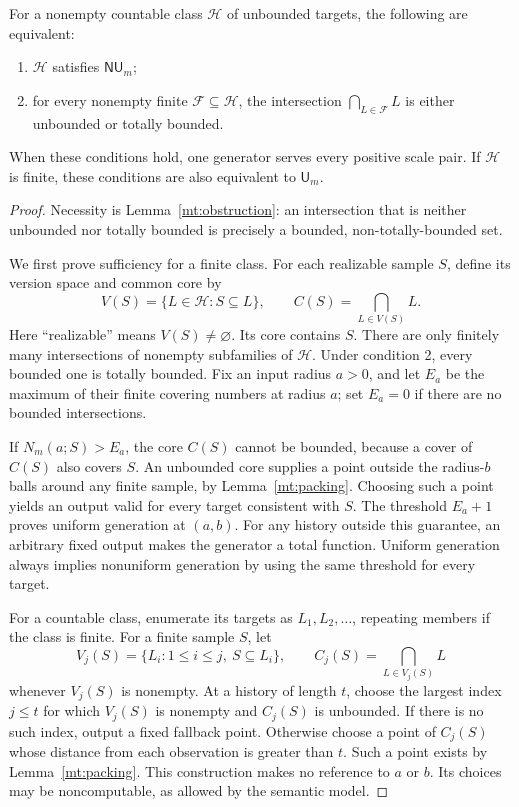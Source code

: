 \begin{theorem}
\label{mt:intersection}
For a nonempty countable class $\mathcal H$ of unbounded targets,
the following are equivalent:
\begin{enumerate}
\item $\mathcal H$ satisfies $\mathsf{NU}_m$;
\item for every nonempty finite $\mathcal F\subseteq\mathcal H$, the
intersection $\bigcap_{L\in\mathcal F}L$ is either unbounded or totally
bounded.
\end{enumerate}
When these conditions hold, one generator serves every positive scale pair.
If $\mathcal H$ is finite, these conditions are also equivalent to
$\mathsf U_m$.
\end{theorem}
\begin{proof}
Necessity is Lemma~\ref{mt:obstruction}: an intersection that is neither
unbounded nor totally bounded is precisely a bounded, non-totally-bounded
set.

We first prove sufficiency for a finite class. For each realizable sample
$S$, define its version space and common core by
\[
 V(S)=\{L\in\mathcal H:S\subseteq L\},
 \qquad C(S)=\bigcap_{L\in V(S)}L.
\]
Here ``realizable'' means $V(S)\ne\varnothing$. Its core contains $S$.
There are only finitely many intersections of nonempty subfamilies of
$\mathcal H$. Under condition 2, every bounded one is totally bounded.
Fix an input radius $a>0$, and let $E_a$ be the maximum of their finite
covering numbers at radius $a$; set $E_a=0$ if there are no bounded
intersections.

If $N_m(a;S)>E_a$, the core $C(S)$ cannot be bounded, because a cover
of $C(S)$ also covers $S$. An unbounded core supplies a point outside
the radius-$b$ balls around any finite sample, by Lemma~\ref{mt:packing}.
Choosing such a point yields an output valid for every target consistent
with $S$. The threshold $E_a+1$ proves uniform generation at $(a,b)$.
For any history outside this guarantee, an arbitrary fixed output makes
the generator a total function. Uniform generation always implies
nonuniform generation by using the same threshold for every target.

For a countable class, enumerate its targets as $L_1,L_2,\ldots$,
repeating members if the class is finite. For a finite sample $S$, let
\[
 V_j(S)=\{L_i:1\le i\le j,\ S\subseteq L_i\},
 \qquad C_j(S)=\bigcap_{L\in V_j(S)}L
\]
whenever $V_j(S)$ is nonempty. At a history of length $t$, choose the
largest index $j\le t$ for which $V_j(S)$ is nonempty and $C_j(S)$ is
unbounded. If there is no such index, output a fixed fallback point.
Otherwise choose a point of $C_j(S)$ whose distance from each observation
is greater than $t$. Such a point exists by Lemma~\ref{mt:packing}.
This construction makes no reference to $a$ or $b$. Its choices may be
noncomputable, as allowed by the semantic model.


\end{proof}
